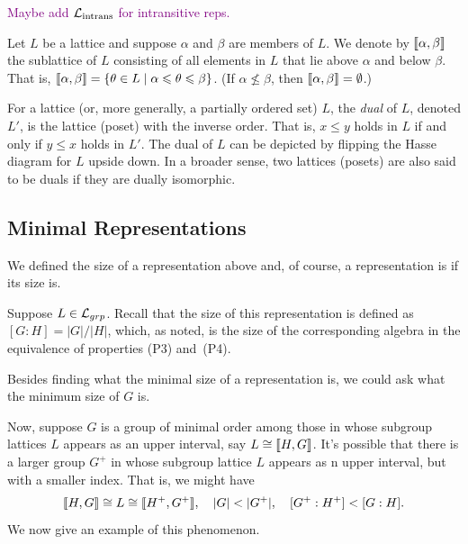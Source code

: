 \textcolor{purple}{Maybe add $\mathcal{L}_{\text{intrans}}$ for intransitive reps.}

Let $L$ be a lattice and suppose $\alpha$ and $\beta$ are members of $L$.  
We denote by $\llbracket \alpha, \beta \rrbracket$ the sublattice of $L$ consisting of all
elements in $L$ that lie above $\alpha$ and below $\beta$.  
That is, 
$\llbracket \alpha, \beta \rrbracket = 
\{\theta \in L \mid \alpha \leqslant \theta \leqslant \beta\}$.
(If $\alpha \nleq \beta$, then $\llbracket \alpha, \beta \rrbracket = \emptyset$.)

For a lattice (or, more generally, a partially ordered set) 
$L$, the \emph{dual} of $L$, denoted
$L'$, is the lattice (poset) with the inverse order. That is, 
$x \leq y$ holds in $L$ if and only if $y \leq x$ holds in $L'$. 
The dual of $L$ can be depicted by flipping the Hasse diagram
for $L$ upside down. 
In a broader sense, two lattices (posets) are also said to be duals if they are
dually isomorphic.

\subsection{Minimal Representations}
\label{sec:minim-repr}
We defined the size of a representation above and, of course, a representation is
 if its size is.

Suppose $L\in \mathcal{L}_{grp}$. Recall that the size of this representation
is defined as $[G : H]=|G|/|H|$, which, as noted, is the size of the 
corresponding algebra in the equivalence of properties (P3) and~(P4). 

Besides finding what the minimal size of a representation is, we could ask
what the minimum size of $G$ is.



Now, suppose $G$ is a group of minimal order among those in whose
subgroup lattices $L$ appears as an upper interval, say $L \cong \llbracket H, G\rrbracket$.
It's possible that there is a larger group $G^+$ in whose subgroup lattice $L$
appears as n upper interval, but with a smaller index. That is, we might have
\[\llbracket H, G \rrbracket \cong L \cong \llbracket H^+, G^+\rrbracket, \quad |G| < |G^+|,
\quad [G^+:H^+] < [G:H].\]
We now give an example of this phenomenon. 

